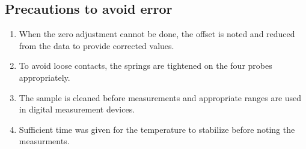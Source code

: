 	\subsection{Precautions to avoid error}
		\begin{enumerate}
			\item When the zero adjustment cannot be done, the offset is noted and reduced from the data to provide corrected values.
			\item To avoid loose contacts, the springs are tightened on the four probes appropriately.
			\item The sample is cleaned before measurements and appropriate ranges are used in digital measurement devices.
			\item Sufficient time was given for the temperature to stabilize before noting the measurments.
		\end{enumerate}
